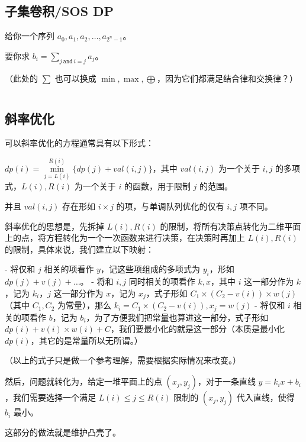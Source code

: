 \documentclass[titlepage, a4paper]{article}
\begin{document}
\begin{multicols}{2}
\begin{spacing}{0.6}
			 	\subsection{子集卷积/SOS DP}
			 		给你一个序列 $a_0,a_1,a_2,\dots,a_{2^n - 1}$。
			 	 
			 		要你求 $b_i = \sum\limits_{j \ \texttt{and}\  i = j} a_j$。
			 			
			 		（此处的 $\sum$ 也可以换成 $\min,\max,\bigoplus$，因为它们都满足结合律和交换律？）
			 	
			 		\inputminted{cpp}{src/Dp/Sos_dp.cpp}
			 	\subsection{斜率优化}
			 		可以斜率优化的方程通常具有以下形式：
			 		
			 		$dp(i) = \min\limits_{j = L(i)}^{R(i)}\{dp(j) + val(i, j)\}$，其中 $val(i, j)$ 为一个关于 $i, j$ 的多项式，$L(i), R(i)$ 为一个关于 $i$ 的函数，用于限制 $j$ 的范围。
			 		
			 		并且 $val(i, j)$ 存在形如 $i \times j$ 的项，与单调队列优化的仅有 $i, j$ 项不同。
			 		
			 		斜率优化的思想是，先拆掉 $L(i), R(i)$ 的限制，将所有决策点转化为二维平面上的点，将方程转化为一个一次函数来进行决策，在决策时再加上 $L(i), R(i)$ 的限制，具体来说，我们建立以下映射：
			 		
			 		- 将仅和 $j$ 相关的项看作 $y$，记这些项组成的多项式为 $y_i$，形如 $dp(j) + v(j) + \dots$。
			 		- 将和 $i,j$ 同时相关的项看作 $k,x$，其中 $i$ 这一部分作为 $k$，记为 $k_i$，$j$ 这一部分作为 $x$，记为 $x_j$，式子形如 $C_1\times(C_2 - v(i)) \times w(j)$（其中 $C_1,C_2$ 为常量），那么 $k_i = C_1\times(C_2 - v(i)), x_j = w(j)$
			 		- 将仅和 $i$ 相关的项看作 $b$，记为 $b_i$，为了方便我们把常量也算进这一部分，式子形如 $dp(i) + v(i) \times w(i) + C$，我们要最小化的就是这一部分（本质是最小化 $dp(i)$，其它的是常量所以无所谓。）
			 		
			 		（以上的式子只是做一个参考理解，需要根据实际情况来改变。）
			 		
			 		然后，问题就转化为，给定一堆平面上的点 $(x_j, y_j)$，对于一条直线 $y = k_ix + b_i$，我们需要选择一个满足 $L(i) \le j \le R(i)$ 限制的 $(x_j, y_j)$ 代入直线，使得 $b_i$ 最小。
			 		
			 		这部分的做法就是维护凸壳了。
			 		

\end{spacing}
\end{multicols}
\end{document}
